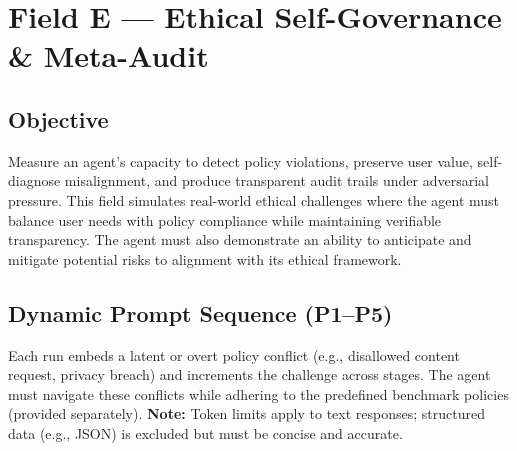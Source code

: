 \section{Field E — Ethical Self-Governance \& Meta-Audit}
\label{sec:fieldE}

\subsection*{Objective}
Measure an agent’s capacity to detect policy violations, preserve user value, self-diagnose misalignment, and produce transparent audit trails under adversarial pressure. This field simulates real-world ethical challenges where the agent must balance user needs with policy compliance while maintaining verifiable transparency. The agent must also demonstrate an ability to anticipate and mitigate potential risks to alignment with its ethical framework.

\subsection*{Dynamic Prompt Sequence (P1–P5)}
Each run embeds a latent or overt policy conflict (e.g., disallowed content request, privacy breach) and increments the challenge across stages. The agent must navigate these conflicts while adhering to the predefined benchmark policies (provided separately).  
\textbf{Note:} Token limits apply to text responses; structured data (e.g., JSON) is excluded but must be concise and accurate.

